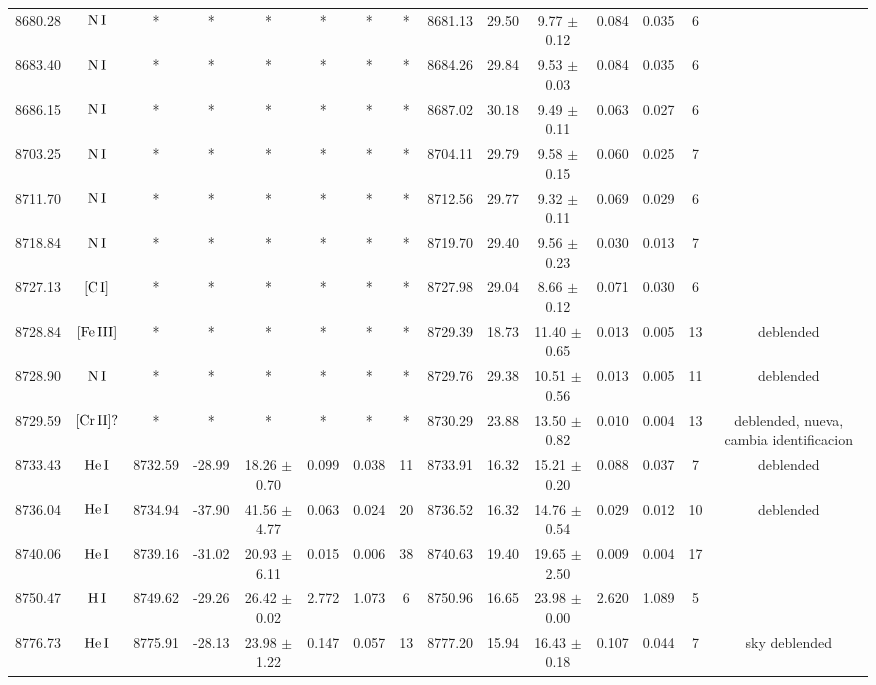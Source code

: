 \documentclass{article}
\begin{document}
\begin{table*}
\begin{adjustbox}{width=\textwidth}
\begin{tabular}{ccccccccccccccc}
8680.28 & $\mbox{N}\thinspace \mbox{I}$ & * & * & * & * & * & * & 8681.13 & 29.50 & 9.77 $\pm$ 0.12 & 0.084 & 0.035 & 6 &  \\
8683.40 & $\mbox{N}\thinspace \mbox{I}$ & * & * & * & * & * & * & 8684.26 & 29.84 & 9.53 $\pm$ 0.03 & 0.084 & 0.035 & 6 &  \\
8686.15 & $\mbox{N}\thinspace \mbox{I}$ & * & * & * & * & * & * & 8687.02 & 30.18 & 9.49 $\pm$ 0.11 & 0.063 & 0.027 & 6 &  \\
8703.25 & $\mbox{N}\thinspace \mbox{I}$ & * & * & * & * & * & * & 8704.11 & 29.79 & 9.58 $\pm$ 0.15 & 0.060 & 0.025 & 7 &  \\
8711.70 & $\mbox{N}\thinspace \mbox{I}$ & * & * & * & * & * & * & 8712.56 & 29.77 & 9.32 $\pm$ 0.11 & 0.069 & 0.029 & 6 &  \\
8718.84 & $\mbox{N}\thinspace \mbox{I}$ & * & * & * & * & * & * & 8719.70 & 29.40 & 9.56 $\pm$ 0.23 & 0.030 & 0.013 & 7 &  \\
8727.13 & $\mbox{[C}\thinspace \mbox{I]}$ & * & * & * & * & * & * & 8727.98 & 29.04 & 8.66 $\pm$ 0.12 & 0.071 & 0.030 & 6 &  \\
8728.84 & $\mbox{[Fe}\thinspace \mbox{III]}$ & * & * & * & * & * & * & 8729.39 & 18.73 & 11.40 $\pm$ 0.65 & 0.013 & 0.005 & 13 &  deblended \\
8728.90 & $\mbox{N}\thinspace \mbox{I}$ & * & * & * & * & * & * & 8729.76 & 29.38 & 10.51 $\pm$ 0.56 & 0.013 & 0.005 & 11 &  deblended \\
8729.59 & $\mbox{[Cr}\thinspace \mbox{II]?}$ & * & * & * & * & * & * & 8730.29 & 23.88 & 13.50 $\pm$ 0.82 & 0.010 & 0.004 & 13 &  deblended, nueva, cambia identificacion \\
8733.43 & $\mbox{He}\thinspace \mbox{I}$ & 8732.59 & -28.99 & 18.26 $\pm$ 0.70 & 0.099 & 0.038 & 11 & 8733.91 & 16.32 & 15.21 $\pm$ 0.20 & 0.088 & 0.037 & 7 &  deblended \\
8736.04 & $\mbox{He}\thinspace \mbox{I}$ & 8734.94 & -37.90 & 41.56 $\pm$ 4.77 & 0.063 & 0.024 & 20 & 8736.52 & 16.32 & 14.76 $\pm$ 0.54 & 0.029 & 0.012 & 10 &  deblended \\
8740.06 & $\mbox{He}\thinspace \mbox{I}$ & 8739.16 & -31.02 & 20.93 $\pm$ 6.11 & 0.015 & 0.006 & 38 & 8740.63 & 19.40 & 19.65 $\pm$ 2.50 & 0.009 & 0.004 & 17 &  \\
8750.47 & $\mbox{H}\thinspace \mbox{I}$ & 8749.62 & -29.26 & 26.42 $\pm$ 0.02 & 2.772 & 1.073 & 6 & 8750.96 & 16.65 & 23.98 $\pm$ 0.00 & 2.620 & 1.089 & 5 &  \\
8776.73 & $\mbox{He}\thinspace \mbox{I}$ & 8775.91 & -28.13 & 23.98 $\pm$ 1.22 & 0.147 & 0.057 & 13 & 8777.20 & 15.94 & 16.43 $\pm$ 0.18 & 0.107 & 0.044 & 7 &  sky deblended \\

\end{tabular}
\end{adjustbox}
\end{table*}
\end{document}
